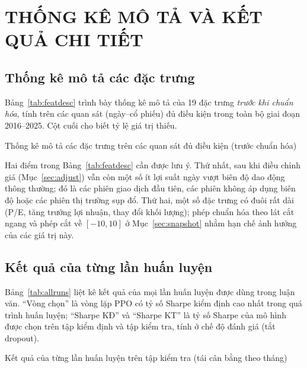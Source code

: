 \chapter{THỐNG KÊ MÔ TẢ VÀ KẾT QUẢ CHI TIẾT}
\label{app:detail}

\section{Thống kê mô tả các đặc trưng}

Bảng~\ref{tab:featdesc} trình bày thống kê mô tả của 19 đặc trưng \emph{trước khi chuẩn hóa}, tính trên các quan sát (ngày--cổ phiếu) đủ điều kiện trong toàn bộ giai đoạn 2016--2025. Cột cuối cho biết tỷ lệ giá trị thiếu.

\begin{table}[ht]
\centering\footnotesize
\caption{Thống kê mô tả các đặc trưng trên các quan sát đủ điều kiện (trước chuẩn hóa)}
\label{tab:featdesc}
\begin{adjustbox}{max width=\textwidth}\end{adjustbox}
\end{table}

Hai điểm trong Bảng~\ref{tab:featdesc} cần được lưu ý. Thứ nhất, sau khi điều chỉnh giá (Mục~\ref{sec:adjust}) vẫn còn một số ít lợi suất ngày vượt biên độ dao động thông thường; đó là các phiên giao dịch đầu tiên, các phiên không áp dụng biên độ hoặc các phiên thị trường sụp đổ. Thứ hai, một số đặc trưng có đuôi rất dài (P/E, tăng trưởng lợi nhuận, thay đổi khối lượng); phép chuẩn hóa theo lát cắt ngang và phép cắt về $[-10,10]$ ở Mục~\ref{sec:snapshot} nhằm hạn chế ảnh hưởng của các giá trị này.

\section{Kết quả của từng lần huấn luyện}

Bảng~\ref{tab:allruns} liệt kê kết quả của mọi lần huấn luyện được dùng trong luận văn. ``Vòng chọn'' là vòng lặp PPO có tỷ số Sharpe kiểm định cao nhất trong quá trình huấn luyện; ``Sharpe KĐ'' và ``Sharpe KT'' là tỷ số Sharpe của mô hình được chọn trên tập kiểm định và tập kiểm tra, tính ở chế độ đánh giá (tắt dropout).

\begin{table}[ht]
\centering\footnotesize
\caption{Kết quả của từng lần huấn luyện trên tập kiểm tra (tái cân bằng theo tháng)}
\label{tab:allruns}
\begin{adjustbox}{max width=\textwidth}\end{adjustbox}
\end{table}
